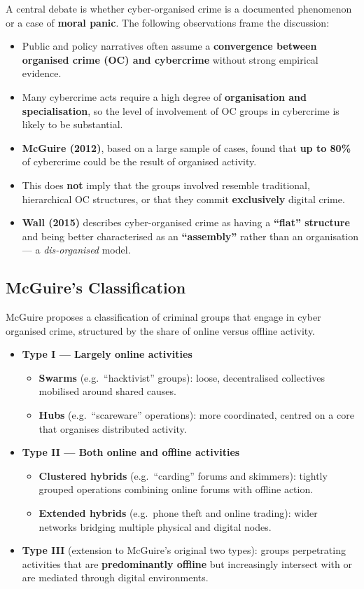\documentclass[11pt,a4paper,openany]{report}
\theoremstyle{definition}
\theoremstyle{plain}
\theoremstyle{remark}
\begin{document}
A central debate is whether cyber-organised crime is a documented phenomenon or a case of \textbf{moral panic}. The following observations frame the discussion:
\begin{itemize}
    \item Public and policy narratives often assume a \textbf{convergence between organised crime (OC) and cybercrime} without strong empirical evidence.
    \item Many cybercrime acts require a high degree of \textbf{organisation and specialisation}, so the level of involvement of OC groups in cybercrime is likely to be substantial.
    \item \textbf{McGuire (2012)}, based on a large sample of cases, found that \textbf{up to 80\%} of cybercrime could be the result of organised activity.
    \item This does \textbf{not} imply that the groups involved resemble traditional, hierarchical OC structures, or that they commit \textbf{exclusively} digital crime.
    \item \textbf{Wall (2015)} describes cyber-organised crime as having a \textbf{``flat'' structure} and being better characterised as an \textbf{``assembly''} rather than an organisation --- a \textit{dis-organised} model.
\end{itemize}

\subsection{McGuire's Classification}

McGuire proposes a classification of criminal groups that engage in cyber organised crime, structured by the share of online versus offline activity.

\begin{itemize}
    \item \textbf{Type I --- Largely online activities}
    \begin{itemize}
        \item \textbf{Swarms} (e.g.\ ``hacktivist'' groups): loose, decentralised collectives mobilised around shared causes.
        \item \textbf{Hubs} (e.g.\ ``scareware'' operations): more coordinated, centred on a core that organises distributed activity.
    \end{itemize}
    \item \textbf{Type II --- Both online and offline activities}
    \begin{itemize}
        \item \textbf{Clustered hybrids} (e.g.\ ``carding'' forums and skimmers): tightly grouped operations combining online forums with offline action.
        \item \textbf{Extended hybrids} (e.g.\ phone theft and online trading): wider networks bridging multiple physical and digital nodes.
    \end{itemize}
    \item \textbf{Type III} (extension to McGuire's original two types): groups perpetrating activities that are \textbf{predominantly offline} but increasingly intersect with or are mediated through digital environments.
\end{itemize}
\end{document}
